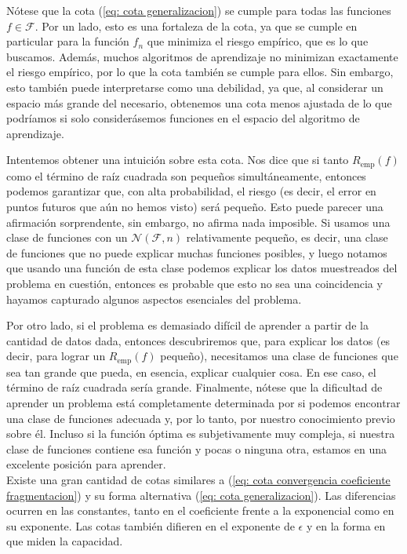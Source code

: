 \documentclass{report}
\begin{document}
Nótese que la cota (\ref{eq: cota generalizacion}) se cumple para todas las funciones \(f \in \mathcal{F}\). 
Por un lado, esto es una fortaleza 
de la cota, ya que se cumple en particular para la función \(f_n\) que minimiza el riesgo empírico, que es lo que 
buscamos. Además, muchos algoritmos de aprendizaje no minimizan exactamente el riesgo empírico, por lo que la cota 
también se cumple para ellos. Sin embargo, esto también puede interpretarse como una debilidad, ya que, al considerar 
un espacio más grande del necesario, obtenemos una cota menos ajustada de lo que podríamos si solo considerásemos
funciones en el espacio del algoritmo de aprendizaje.\newline

Intentemos obtener una intuición sobre esta cota. Nos dice que si tanto \(R_{\text{emp}}(f)\) como el término 
de raíz cuadrada son pequeños simultáneamente, entonces podemos garantizar que, con alta probabilidad, el 
riesgo (es decir, el error en puntos futuros que aún no hemos visto) será pequeño. Esto puede parecer una 
afirmación sorprendente, sin embargo, no afirma nada imposible. Si usamos una clase de funciones con un 
\(\mathcal{N}(\mathcal{F}, n)\) relativamente pequeño, es decir, una clase de funciones que no puede explicar 
muchas funciones posibles, y luego notamos que usando una función de esta clase podemos explicar los datos muestreados 
del problema en cuestión, entonces es probable que esto no sea una coincidencia y hayamos capturado algunos aspectos 
esenciales del problema. \newline

Por otro lado, si el problema es demasiado difícil de aprender a partir de la cantidad de datos dada, entonces 
descubriremos que, para explicar los datos (es decir, para lograr un \(R_{\text{emp}}(f)\) pequeño), necesitamos 
una clase de funciones que sea tan grande que pueda, en esencia, explicar cualquier cosa. En ese caso, el término 
de raíz cuadrada sería grande. Finalmente, nótese que la dificultad de aprender un problema está completamente 
determinada por si podemos encontrar una clase de funciones adecuada y, por lo tanto, por nuestro conocimiento 
previo sobre él. Incluso si la función óptima es subjetivamente muy compleja, si nuestra clase de funciones 
contiene esa función y pocas o ninguna otra, estamos en una excelente posición para aprender.\\

Existe una gran cantidad de cotas similares a (\ref{eq: cota convergencia coeficiente fragmentacion}) 
y su forma alternativa (\ref{eq: cota generalizacion}). Las diferencias ocurren en 
las constantes, tanto en el coeficiente frente a la exponencial como en su exponente. Las cotas también 
difieren en el exponente de \(\epsilon\) y en la forma en que miden la capacidad.\newline
\end{document}
